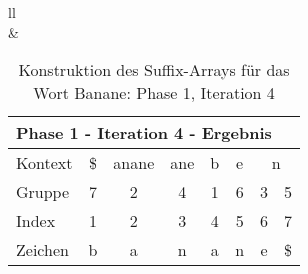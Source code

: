 \begin{table}[H]
\begin{adjustbox}{max width=\textwidth}
\begin{tabular}{ll}
\\
&
\\

\begin{tabular}{lccccccc}
\multicolumn{8}{l}{Phase 1 - Iteration 4 - Ergebnis}                                                                                                                                                              \\ \hline
\multicolumn{1}{l|}{Kontext} & \multicolumn{1}{c|}{\$} & \multicolumn{1}{c|}{\cellcolor[HTML]{\yellow}anane} & \multicolumn{1}{c|}{ane} & \multicolumn{1}{c|}{b} & \multicolumn{1}{c|}{e} & \multicolumn{2}{c}{n} \\
\multicolumn{1}{l|}{Gruppe}  & \multicolumn{1}{c|}{7}  & \multicolumn{1}{c|}{\cellcolor[HTML]{\yellow}2}     & \multicolumn{1}{c|}{4}   & \multicolumn{1}{c|}{1} & \multicolumn{1}{c|}{6} & 3         & 5          \\ \hline
\multicolumn{1}{l|}{Index}   & 1                       & 2                                                  & 3                        & 4                      & 5                      & 6         & 7          \\
\multicolumn{1}{l|}{Zeichen} & b                       & a                                                  & n                        & a                      & n                      & e         & \$        
\end{tabular}

\end{tabular}
\end{adjustbox}

\caption[Konstruktion des Suffix-Arrays für das Wort Banane: Phase 1, Iteration 4]{Konstruktion des Suffix-Arrays für das Wort Banane: Phase 1, Iteration 4}
\label{fig_banane_1_4} 
\end{table}
